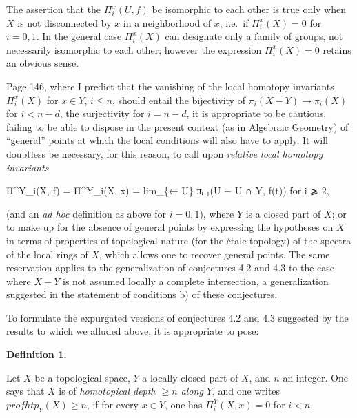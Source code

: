 \documentclass[
]{article}
\newenvironment{Shaded}{}{}
\newcommand{\NormalTok}[1]{#1}
\begin{document}
The assertion that the \(\Pi^{x}_{i}(U, f)\) be isomorphic to each other
is true only when \(X\) is not disconnected by \(x\) in a neighborhood
of \(x\), i.e.~if \(\Pi^{x}_{i}(X) = 0\) for \(i = 0, 1\). In the
general case \(\Pi^{x}_{i}(X)\) can designate only a family of groups,
not necessarily isomorphic to each other; however the expression
\(\Pi^{x}_{i}(X) = 0\) retains an obvious sense.

Page 146, where I predict that the vanishing of the local homotopy
invariants \(\Pi^{x}_{i}(X)\) for \(x \in Y\), \(i \leqslant n\), should
entail the bijectivity of \(\pi_{i}(X - Y) \to \pi_{i}(X)\) for
\(i < n - d\), the surjectivity for \(i = n - d\), it is appropriate to
be cautious, failing to be able to dispose in the present context (as in
Algebraic Geometry) of ``general'' points at which the local conditions
will also have to apply. It will doubtless be necessary, for this
reason, to call upon \emph{relative local homotopy invariants}

\begin{Shaded}
\begin{Highlighting}[]
\NormalTok{Π\^{}Y\_i(X, f) = Π\^{}Y\_i(X, x) = lim\_\{← U\} πᵢ₋₁(U − U ∩ Y, f(t))   for i ⩾ 2,}
\end{Highlighting}
\end{Shaded}

(and an \emph{ad hoc} definition as above for \(i = 0, 1\)), where \(Y\)
is a closed part of \(X\); or to make up for the absence of general
points by expressing the hypotheses on \(X\) in terms of properties of
topological nature (for the étale topology) of the spectra of the local
rings of \(X\), which allows one to recover general points. The same
reservation applies to the generalization of conjectures 4.2 and 4.3 to
the case where \(X - Y\) is not assumed locally a complete intersection,
a generalization suggested in the statement of conditions b) of these
conjectures.

To formulate the expurgated versions of conjectures 4.2 and 4.3
suggested by the results to which we alluded above, it is appropriate to
pose:

\textbf{Definition 1.}

Let \(X\) be a topological space, \(Y\) a locally closed part of \(X\),
and \(n\) an integer. One says that \(X\) is of \emph{homotopical depth
\(\geqslant n\) along \(Y\)}, and one writes
\(prof htp_{Y}(X) \geqslant n\), if for every \(x \in Y\), one has
\(\Pi^{Y}_{i}(X, x) = 0\) for \(i < n\).
\end{document}
